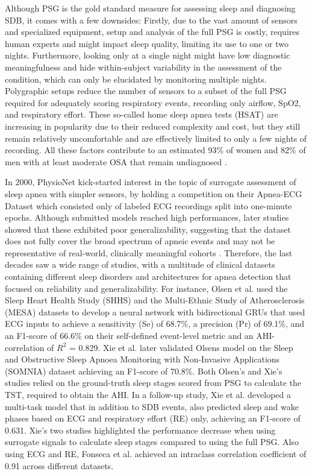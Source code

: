 Although PSG is the gold standard measure for assessing sleep and diagnosing SDB, it comes with a few downsides: Firstly, due to the vast amount of sensors and specialized equipment, setup and analysis of the full PSG is costly, requires human experts and might impact sleep quality, limiting its use to one or two nights. Furthermore, looking only at a single night might have low diagnostic meaningfulness \cite{toussaint1995first} and hide within-subject variability in the assessment of the condition, which can only be elucidated by monitoring multiple nights.
Polygraphic setups reduce the number of sensors to a subset of the full PSG required for adequately scoring respiratory events, recording only airflow, SpO2, and respiratory effort. These so-called home sleep apnea tests (HSAT) are increasing in popularity due to their reduced complexity and cost, but they still remain relatively uncomfortable and are effectively limited to only a few nights of recording.
All these factors contribute to an estimated 93\% of women and 82\% of men with at least moderate OSA that remain undiagnosed \cite{young1997estimation}.

In 2000, PhysioNet kick-started interest in the topic of surrogate assessment of sleep apnea with simpler sensors, by holding a competition on their Apnea-ECG Dataset which consisted only of labeled ECG recordings split into one-minute epochs. Although submitted models reached high performances, later studies showed that these exhibited poor generalizability, suggesting that the dataset does not fully cover the broad spectrum of apneic events and may not be representative of real-world, clinically meaningful cohorts \cite{papini2018generalizability}. Therefore, the last decades saw a wide range of studies, with a multitude of clinical datasets containing different sleep disorders and architectures for apnea detection that focused on reliability and generalizability.
For instance, Olsen et al. \cite{olsen2020robust} used the Sleep Heart Health Study (SHHS) \cite{quan1997sleep} and the Multi-Ethnic Study of Atherosclerosis (MESA) \cite{chen2015racial} datasets to develop a neural network with bidirectional GRUs that used ECG inputs to achieve a sensitivity (Se) of 68.7\%, a precision (Pr) of 69.1\%, and an F1-score of 66.6\% on their self-defined event-level metric and an AHI-correlation of $R^2$ = 0.829. Xie et al. \cite{xie2023use} later validated Olsens model on the Sleep and Obstructive Sleep Apnoea Monitoring with Non-Invasive Applications (SOMNIA) \cite{van2019protocol} dataset achieving an F1-score of 70.8\%. Both Olsen's and Xie's studies relied on the ground-truth sleep stages scored from PSG to calculate the TST, required to obtain the AHI. In a follow-up study, Xie et al. \cite{xie2024multi} developed a multi-task model that in addition to SDB events, also predicted sleep and wake phases based on ECG and respiratory effort (RE) only, achieving an F1-score of 0.631. Xie's two studies highlighted the performance decrease when using surrogate signals to calculate sleep stages compared to using the full PSG. Also using ECG and RE, Fonseca et al. \cite{fonseca2024estimating} achieved an intraclass correlation coefficient of 0.91 across different datasets.

